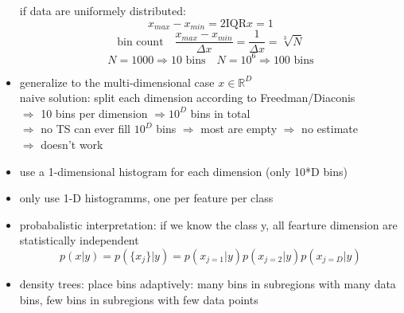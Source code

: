 \documentclass[11pt]{article}
\begin{document}
\begin{itemize}
             if data are uniformely distributed:
             \begin{equation*}
               x_{max}-x_{min} = 2 \text{IQR}{x} = 1
             \end{equation*}
             \begin{equation*}
               \text{bin count} \quad \frac{x_{max}-x_{min}}{\Delta x} = \frac{1}{\Delta x} = \sqrt[3]{N}
             \end{equation*}
             \begin{equation*}
               N = 1000 \Rightarrow 10 \text{ bins} \quad N=10^6 \Rightarrow 100 \text{ bins}
             \end{equation*}
             \item generalize to the multi-dimensional case $x \in \mathbb{R}^D$ \\
             naive solution: split each dimension according to Freedman/Diaconis \\
             $\Rightarrow$ 10 bins per dimension $\Rightarrow 10^D$ bins in total \\
             $\Rightarrow$ no TS can ever fill $10^D$ bins $\Rightarrow$ most are empty $\Rightarrow$ no estimate \\
             $\Rightarrow$ doesn't work
           \end{itemize}

             \begin{itemize}
               \item use a 1-dimensional histogram for each dimension (only 10*D bins)
               \item only use 1-D histogramms, one per feature per class
               \item probabalistic interpretation: if we know the class y, all fearture dimension
               are statistically independent
               \begin{equation*}
                 p(x|y)=p(\{ x_j\}|y)=p(x_{j=1}|y)p(x_{j=2}|y)p(x_{j=D}|y)
               \end{equation*}
               \item density trees: place bins adaptively: many bins in subregions with many data bins,
               few bins in subregions with few data points
             \end{itemize}
\end{document}
